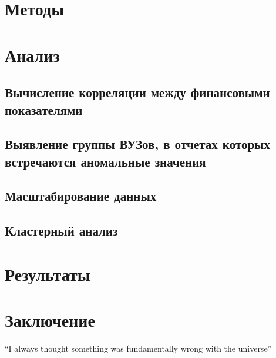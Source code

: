 \documentclass{article}
\begin{document}
\section{Методы}

\section{Анализ}
\subsection{Вычисление корреляции между финансовыми показателями}
\subsection{Выявление группы ВУЗов, в отчетах которых встречаются аномальные значения}
\subsection{Масштабирование данных}
\subsection{Кластерный анализ}

\section{Результаты}

\section{Заключение}
``I always thought something was fundamentally wrong with the universe'' \citep{adams1995hitchhiker}



\end{document}
